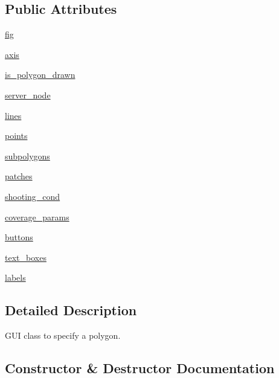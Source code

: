 \subsection*{Public Attributes}
\begin{DoxyCompactItemize}
\item 
\hyperlink{classspecify__rect_1_1_polygon_builder_a5d63c74cd194ac983e9850c78cb7b3a9}{fig}
\item 
\hyperlink{classspecify__rect_1_1_polygon_builder_a2e0bae7011df2f887456db5d5929184a}{axis}
\item 
\hyperlink{classspecify__rect_1_1_polygon_builder_adfc46d632c7bd9dac9bb240a95b6c64f}{is\+\_\+polygon\+\_\+drawn}
\item 
\hyperlink{classspecify__rect_1_1_polygon_builder_a29db398c9c15e5b685ebb76543e80cd1}{server\+\_\+node}
\item 
\hyperlink{classspecify__rect_1_1_polygon_builder_a79a02e4bf8b8ff8c55150b912a0ca2d8}{lines}
\item 
\hyperlink{classspecify__rect_1_1_polygon_builder_a7bc5a210c86dc22629338c45b1b03b64}{points}
\item 
\hyperlink{classspecify__rect_1_1_polygon_builder_a7d0cd051c89820a27adcc6553effd667}{subpolygons}
\item 
\hyperlink{classspecify__rect_1_1_polygon_builder_a7327ec29baa19ea1b0d347940b4e671b}{patches}
\item 
\hyperlink{classspecify__rect_1_1_polygon_builder_a64e2c740d25d38d33e1fa903e30a5d67}{shooting\+\_\+cond}
\item 
\hyperlink{classspecify__rect_1_1_polygon_builder_a714713f2a2f6a8aad8c3649f1d0280fb}{coverage\+\_\+params}
\item 
\hyperlink{classspecify__rect_1_1_polygon_builder_a87c22817d1c77064fe3c1f72a8c8273a}{buttons}
\item 
\hyperlink{classspecify__rect_1_1_polygon_builder_a9fd3c4817fb95e2bb1015749a82d4627}{text\+\_\+boxes}
\item 
\hyperlink{classspecify__rect_1_1_polygon_builder_a4994ebc00aeb79ac5eea5b6c38785eae}{labels}
\end{DoxyCompactItemize}


\subsection{Detailed Description}
G\+UI class to specify a polygon. 

\subsection{Constructor \& Destructor Documentation}
